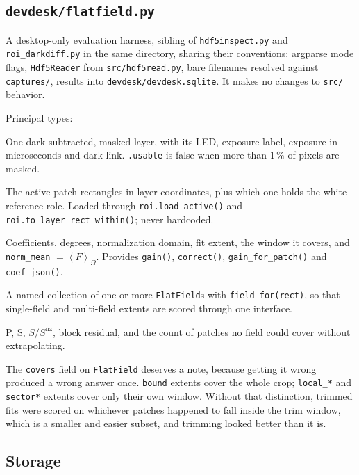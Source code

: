 \documentclass[11pt, a4paper]{article}
\newcommand{\code}[1]{\texttt{#1}}
\newcommand{\pct}{\,\%}
\newcommand{\mean}[2]{\left\langle #1 \right\rangle_{#2}}
\begin{document}
\subsection{\code{devdesk/flatfield.py}}

A desktop-only evaluation harness,
sibling of \code{hdf5inspect.py} and \code{roi\_darkdiff.py}
in the same directory,
sharing their conventions:
argparse mode flags,
\code{Hdf5Reader} from \code{src/hdf5read.py},
bare filenames resolved against \code{captures/},
results into \code{devdesk/devdesk.sqlite}.
It makes no changes to \code{src/} behavior.

Principal types:

\begin{description}[style=nextline, leftmargin=1em]
\item[\code{Frame}]
  One dark-subtracted, masked layer,
  with its LED, exposure label, exposure in microseconds and dark link.
  \code{.usable} is false when more than $1\pct$ of pixels are masked.
\item[\code{Patches}]
  The active patch rectangles in layer coordinates,
  plus which one holds the white-reference role.
  Loaded through \code{roi.load\_active()} and
  \code{roi.to\_layer\_rect\_within()};
  never hardcoded.
\item[\code{FlatField}]
  Coefficients, degrees, normalization domain, fit extent,
  the window it covers, and \code{norm\_mean} $= \mean{F}{\Omega}$.
  Provides \code{gain()}, \code{correct()}, \code{gain\_for\_patch()}
  and \code{coef\_json()}.
\item[\code{Model}]
  A named collection of one or more \code{FlatField}s
  with \code{field\_for(rect)},
  so that single-field and multi-field extents
  are scored through one interface.
\item[\code{Score}]
  P, S, $S/S^{\mathrm{nz}}$, block residual,
  and the count of patches no field could cover without extrapolating.
\end{description}

The \code{covers} field on \code{FlatField} deserves a note,
because getting it wrong produced a wrong answer once.
\code{bound} extents cover the whole crop;
\code{local\_*} and \code{sector*} extents cover only their own window.
Without that distinction,
trimmed fits were scored on whichever patches happened to fall
inside the trim window,
which is a smaller and easier subset,
and trimming looked better than it is.

\subsection{Storage}
\end{document}
